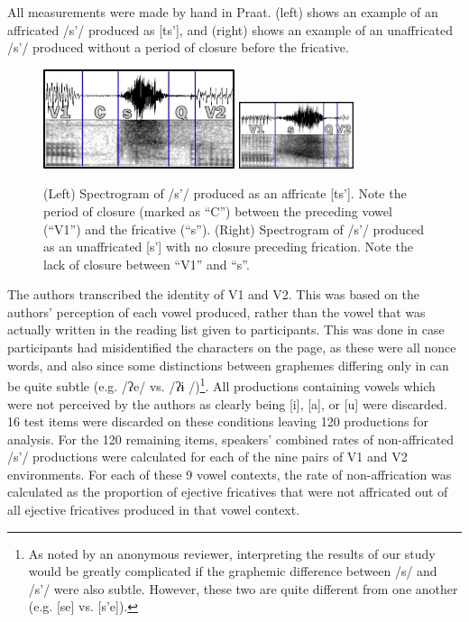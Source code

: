 \documentclass[output=paper
,newtxmath
,modfonts
,nonflat]{langsci/langscibook}
\begin{document}
All measurements were made by hand in Praat.  (left) shows an example of an affricated /s’/ produced as [ts’], and  (right) shows an example of an unaffricated /s’/ produced without a period of closure before the fricative.        
 

\begin{figure}
\includegraphics[width=0.5\textwidth]{figures/fig-moeng-1a}
\includegraphics[width=0.3\textwidth]{figures/fig-moeng-1b}
\caption{(Left) Spectrogram of /s’/ produced as an affricate [ts’]. Note the period of closure (marked as “C”) between the preceding vowel (“V1”) and the fricative (“s”). (Right) Spectrogram of /s’/ produced as an unaffricated [s’] with no closure preceding frication. Note the lack of closure between “V1” and “s”.}
\label{fig:moeng:2}
\end{figure}

The authors transcribed the identity of V1 and V2. This was based on the authors’ perception of each vowel produced, rather than the vowel that was actually written in the reading list given to participants. This was done in case participants had misidentified the characters on the page, as these were all nonce words, and also since some distinctions between graphemes differing only in  can be quite subtle (e.g.  /ʔe/ vs.  /ʔɨ /)\footnote{As noted by an anonymous reviewer, interpreting the results of our study would be greatly complicated if the graphemic difference between /s/ and /s’/ were also subtle. However, these two are quite different from one another (e.g.  [se] vs.  [s’e]).}. All productions containing vowels which were not perceived by the authors as clearly being [i], [a], or [u] were discarded. 16 test items were discarded on these conditions leaving 120 productions for analysis. For the 120 remaining items, speakers’ combined rates of non-affricated /s’/ productions were calculated for each of the nine pairs of V1 and V2 environments. For each of these 9 vowel contexts, the rate of non-affrication was calculated as the proportion of ejective fricatives that were not affricated out of all ejective fricatives produced in that vowel context.
\end{document}

